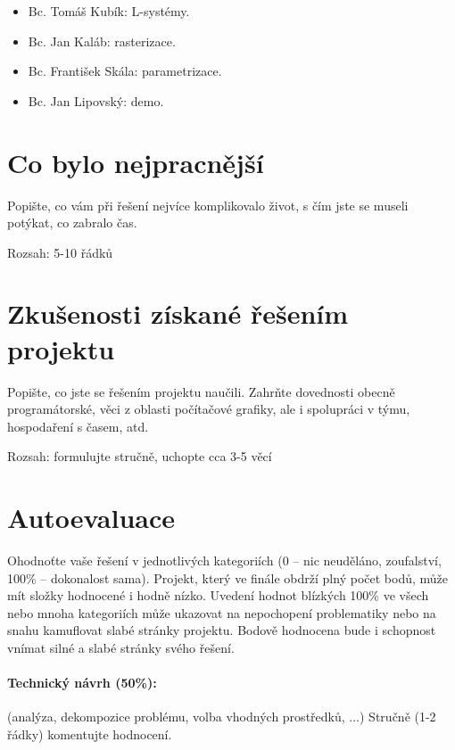 \documentclass[11pt,a4paper]{article}
\begin{document}
\begin{itemize}
\item Bc. Tomáš Kubík: L-systémy.
\item Bc. Jan Kaláb: rasterizace.
\item Bc. František Skála: parametrizace.
\item Bc. Jan Lipovský: demo.
\end{itemize}

\section{Co bylo nejpracnější}

Popište, co vám při řešení nejvíce komplikovalo život, s čím jste se museli
potýkat, co zabralo čas.

Rozsah: 5-10 řádků

\section{Zkušenosti získané řešením projektu}

Popište, co jste se řešením projektu naučili. Zahrňte dovednosti obecně
programátorské, věci z oblasti počítačové grafiky, ale i spolupráci v týmu,
hospodaření s časem, atd.

Rozsah: formulujte stručně, uchopte cca 3-5 věcí

\section{Autoevaluace}

Ohodnoťte vaše řešení v jednotlivých kategoriích (0 – nic neuděláno,
zoufalství, 100\% – dokonalost sama). Projekt, který ve finále obdrží plný
počet bodů, může mít složky hodnocené i hodně nízko. Uvedení hodnot blízkých
100\% ve všech nebo mnoha kategoriích může ukazovat na nepochopení problematiky
nebo na snahu kamuflovat slabé stránky projektu. Bodově hodnocena bude i
schopnost vnímat silné a slabé stránky svého řešení.

\paragraph{Technický návrh (50\%):} (analýza, dekompozice problému, volba
vhodných prostředků, $\ldots$) 
Stručně (1-2 řádky) komentujte hodnocení. 
\end{document}
